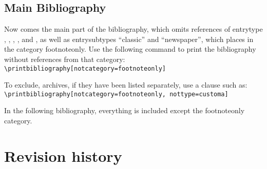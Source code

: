 \documentclass{ltxdockit}[2010/02/12]
\begin{document}
{%
\subsection{Main Bibliography}
Now comes the main part of the bibliography, which omits references of entrytype , , , , and , as well as entrysubtypes \enquote{classic} and \enquote{newspaper}, which  places in the category footnoteonly.
Use the following command to print the bibliography without references from that category: \verb|\printbibliography[notcategory=footnoteonly]|

To exclude, \eg archives, if they have been listed separately, use a clause such as:
\verb|\printbibliography[notcategory=footnoteonly, nottype=customa]|

In the following bibliography, everything is included except the footnoteonly category.


\printbibliography[notcategory=footnoteonly]




\section{Revision history}

\begin{changelog}


\end{changelog}}
\end{document}

